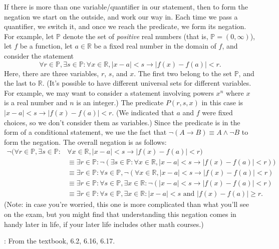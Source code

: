 \documentclass[letterpaper,12pt]{article}
\newcommand{\R}{\mathbb{R}}
\newcommand{\abs}[1]{\lvert #1\rvert}
\begin{document}
If there is more than one variable/quantifier in our statement, then to form the negation we start on the outside, and work our way in. Each time we pass a quantifier, we switch it, and once we reach the predicate, we form its negation. For example, let $\mathbb{P}$ denote the set of {\em positive} real numbers (that is, $\mathbb{P} = (0,\infty)$), let $f$ be a function, let $a\in \R$ be a fixed real number in the domain of $f$, and consider the statement
\[
\forall r\in\mathbb{P}, \exists s\in \mathbb{P}:  \forall x\in\R, \abs{x-a}<s \to \abs{f(x)-f(a)}<r.
\]
Here, there are three variables, $r$, $s$, and $x$. The first two belong to the set $\mathbb{P}$, and the last to $\R$. (It's possible to have different universal sets for different variables. For example, we may want to consider a statement involving powers $x^n$ where $x$ is a real number and $n$ is an integer.) The predicate $P(r,s,x)$ in this case is $\abs{x-a}<s\to \abs{f(x)-f(a)}<r$. (We indicated that $a$ and $f$ were fixed choices, so we don't consider them as variables.) Since the predicate is in the form of a conditional statement, we use the fact that $\neg(A\to B)\equiv A\wedge \neg B$ to form the negation. The overall negation is as follows:
\begin{align*}
\neg (\forall r\in\mathbb{P}, \exists s\in \mathbb{P}: & \forall x\in\R, \abs{x-a}<s \to \abs{f(x)-f(a)}<r)\\
 & \equiv \exists r\in\mathbb{P}: \neg (\exists s\in \mathbb{P}:  \forall x\in\R, \abs{x-a}<s \to \abs{f(x)-f(a)}<r))\\
 &\equiv \exists r\in\mathbb{P}: \forall s\in\mathbb{P}, \neg (\forall x\in \R, \abs{x-a}<s\to \abs{f(x)-f(a)}<r)\\
 &\equiv \exists r\in\mathbb{P}:\forall s\in\mathbb{P}, \exists x\in \R : \neg (\abs{x-a}<s\to \abs{f(x)-f(a)}<r)\\
 &\equiv \exists r\in\mathbb{P}:\forall s\in\mathbb{P}, \exists x\in \R: \abs{x-a}<s \text{ and } \abs{f(x)-f(a)}\geq r.
\end{align*}
(Note: in case you're worried, this one is more complicated than what you'll see on the exam, but you might find that understanding this negation comes in handy later in life, if your later life includes other math courses.)

: From the textbook, 6.2, 6.16, 6.17.
\end{document}
